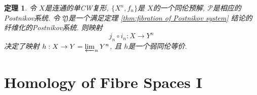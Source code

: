 \documentclass{ctexart}
\theoremstyle{plain}
\newtheorem{theorem}{定理}[section]
\theoremstyle{definition}
\begin{document}
        \begin{theorem}
            令 $X$是连通的单CW复形, $\{X^{n},f_{n}\}$是 $X$的一个同伦预解, $\mathscr{P}$是相应的Postnikov系统. 令 $\mathfrak{Y}$是一个满足定理 \ref{thm:fibration of Postnikov system} 结论的纤维化的Postnikov系统. 则映射 
            \begin{equation*}
              j_{n}\circ i_{n}:X\to Y^{n}
            \end{equation*}
            决定了映射 $h:X\to Y=\varprojlim_{n} Y^{n}$, 且 $h$是一个弱同伦等价.
        \end{theorem}


    \section{Homology of Fibre Spaces I}
        
        

    
	
\end{document}
